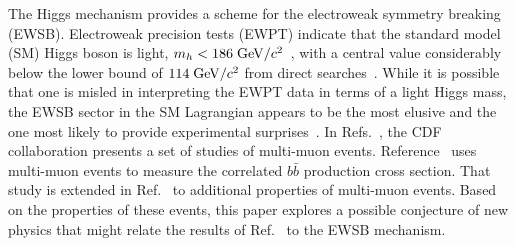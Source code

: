 \documentclass[twocolumn,10pt,prl,preprint,floatfix,nofootinbib,superscriptaddress,showpacs,amssymb]{revtex4}
\begin{document}
 \maketitle
 The Higgs mechanism provides a scheme for the electroweak symmetry breaking
 (EWSB). Electroweak precision tests (EWPT) indicate that the standard model
 (SM) Higgs boson is light, $m_h < 186 \; {\rm GeV/}c^2$~\cite{ewgroup}, with a 
 central value considerably below the lower bound of $114\; {\rm GeV/}c^2$ from 
 direct searches~\cite{hlim}. While it is possible that one is misled in
 interpreting the EWPT data in terms of a light Higgs mass, the EWSB sector
 in the SM Lagrangian appears to be the most elusive and the one most likely
 to provide experimental surprises~\cite{gunion,fullana,gunion1,hidval}.
 In Refs.~\cite{bbxs,a0disc}, the CDF collaboration presents a set of studies
 of multi-muon events.
  Reference~\cite{bbxs} uses multi-muon events to measure the correlated $b\bar{b}$
 production cross section. That study is extended in Ref.~\cite{a0disc} to additional
 properties of multi-muon events.  Based on the
 properties of these events, this paper explores a possible conjecture
 of new physics that might
 relate the results of  Ref.~\cite{a0disc} to the EWSB mechanism.
\end{document}
